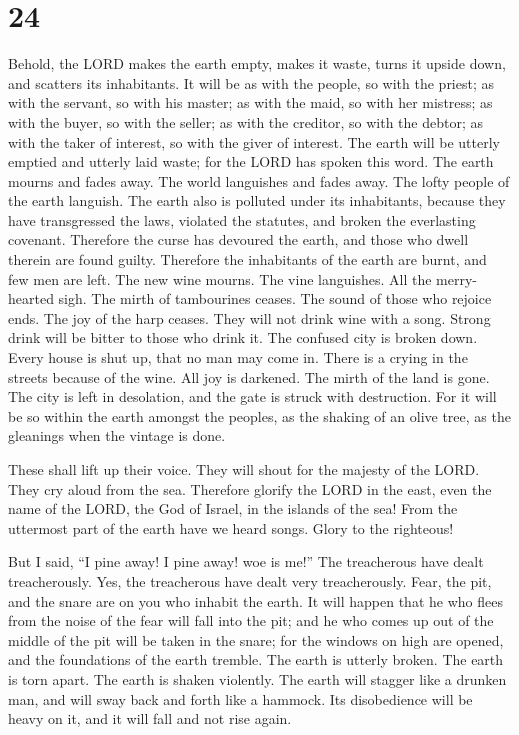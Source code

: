 \hypertarget{section-23}{%
\section{24}\label{section-23}}

 Behold, the LORD makes the earth empty, makes it waste,
turns it upside down, and scatters its inhabitants.  It
will be as with the people, so with the priest; as with the servant, so
with his master; as with the maid, so with her mistress; as with the
buyer, so with the seller; as with the creditor, so with the debtor; as
with the taker of interest, so with the giver of interest.
 The earth will be utterly emptied and utterly laid waste;
for the LORD has spoken this word.  The earth mourns and
fades away. The world languishes and fades away. The lofty people of the
earth languish.  The earth also is polluted under its
inhabitants, because they have transgressed the laws, violated the
statutes, and broken the everlasting covenant.  Therefore
the curse has devoured the earth, and those who dwell therein are found
guilty. Therefore the inhabitants of the earth are burnt, and few men
are left.  The new wine mourns. The vine languishes. All
the merry-hearted sigh.  The mirth of tambourines ceases.
The sound of those who rejoice ends. The joy of the harp ceases.
 They will not drink wine with a song. Strong drink will
be bitter to those who drink it.  The confused city is
broken down. Every house is shut up, that no man may come in.
 There is a crying in the streets because of the wine.
All joy is darkened. The mirth of the land is gone.  The
city is left in desolation, and the gate is struck with destruction.
 For it will be so within the earth amongst the peoples,
as the shaking of an olive tree, as the gleanings when the vintage is
done.

 These shall lift up their voice. They will shout for the
majesty of the LORD. They cry aloud from the sea. 
Therefore glorify the LORD in the east, even the name of the LORD, the
God of Israel, in the islands of the sea!  From the
uttermost part of the earth have we heard songs. Glory to the righteous!

But I said, ``I pine away! I pine away! woe is me!'' The treacherous
have dealt treacherously. Yes, the treacherous have dealt very
treacherously.  Fear, the pit, and the snare are on you
who inhabit the earth.  It will happen that he who flees
from the noise of the fear will fall into the pit; and he who comes up
out of the middle of the pit will be taken in the snare; for the windows
on high are opened, and the foundations of the earth tremble.
 The earth is utterly broken. The earth is torn apart.
The earth is shaken violently.  The earth will stagger
like a drunken man, and will sway back and forth like a hammock. Its
disobedience will be heavy on it, and it will fall and not rise again.

